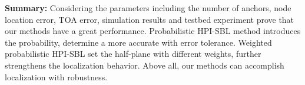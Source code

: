 		
\fi

\textbf{Summary:} Considering the parameters including the number of anchors, node location error, TOA error, simulation results and testbed experiment prove that our methods have a great performance. Probabilistic HPI-SBL method introduces the probability, determine a  more accurate with error tolerance. Weighted probabilistic HPI-SBL set the half-plane with different weights, further strengthens the localization behavior. Above all, our methods can accomplish localization with robustness.


